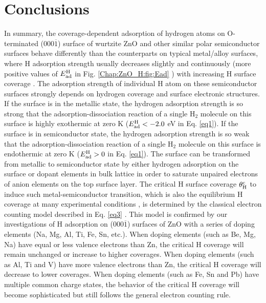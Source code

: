 \section{Conclusions}

In summary, the coverage-dependent adsorption of hydrogen atoms on O-terminated (000$\overline{1}$) surface of wurtzite ZnO and other similar polar semiconductor surfaces behave differently than the counterparts on typical metal/alloy surfaces, where H adsorption strength usually decreases slightly and continuously (more positive values of $E_{\textup{ad}}^{\textup{H}}$ in Fig. \ref{Chap:ZnO_H:fig:Ead} ) with increasing H surface coverage \cite{pallassana1999theoretical,qi2012adsorbate}. The adsorption strength of individual H atom on these semiconductor surfaces strongly depends on hydrogen coverage and surface electronic structures. If the surface is in the metallic state, the hydrogen adsorption strength is so strong that the adsorption-dissociation reaction of a single H$_2$ molecule on this surface is highly exothermic at zero K ($E_{\textup{ad}}^{\textup{H}} < -2.0 $ eV in Eq. \ref{eq1}). If the surface is in semiconductor state, the hydrogen adsorption strength is so weak that the adsorption-dissociation reaction of a single H$_2$ molecule on this surface is endothermic at zero K ($E_{\textup{ad}}^{\textup{H}} > 0 $ in Eq. \ref{eq1}).  The surface can be transformed from metallic to semiconductor state by either hydrogen adsorption on the surface or dopant elements in bulk lattice in order to saturate unpaired electrons of anion elements on the top surface layer. The critical H surface coverage $\theta_{\textup{H}}^{\textup{c}}$ to induce such metal-semiconductor transition, which is also the equilibrium H coverage at many experimental conditions \cite{lin2007density,meyer2004first,lauritsen2011stabilization},  is determined by the classical electron counting model described in Eq. \ref{eq3} \cite{pashley1989electron}. This model is confirmed by our investigations of H adsorption on (000$\overline{1}$) surfaces of ZnO with a series of doping elements (Na, Mg, Al, Ti, Fe, Sn, etc.). When doping elements (such as Be, Mg, Na) have equal or less valence electrons than Zn, the critical H coverage will remain unchanged or increase to higher coverages. When doping elements (such as Al, Ti and V) have more valence electrons than Zn, the critical H coverage will decrease to lower coverages. When doping elements (such as Fe, Sn and Pb) have multiple common charge states, the behavior of the critical H coverage will become sophisticated but still follows the general electron counting rule.

